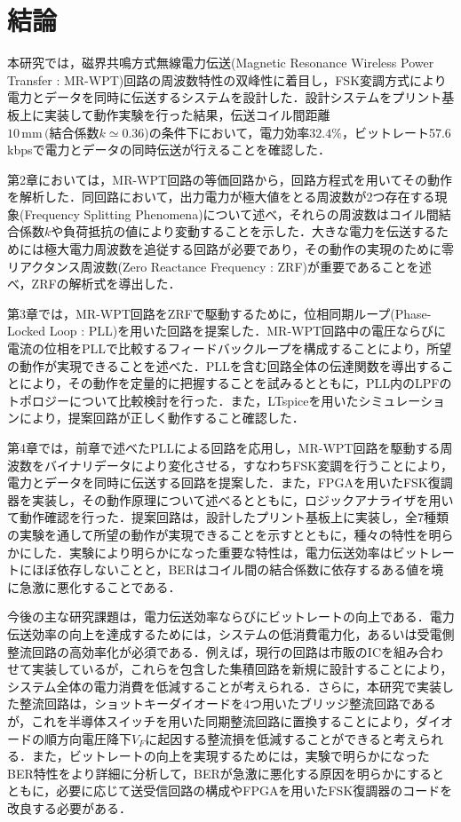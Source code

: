 \chapter{結論}
本研究では，磁界共鳴方式無線電力伝送(Magnetic Resonance Wireless Power Transfer : MR-WPT)回路の周波数特性の双峰性に着目し，FSK変調方式により電力とデータを同時に伝送するシステムを設計した．設計システムをプリント基板上に実装して動作実験を行った結果，伝送コイル間距離$10 \, \mathrm{mm} \, (\mbox{結合係数}k \simeq 0.36$)の条件下において，電力効率$32.4 \%$，ビットレート57.6 kbpsで電力とデータの同時伝送が行えることを確認した．\par 
第2章においては，MR-WPT回路の等価回路から，回路方程式を用いてその動作を解析した．同回路において，出力電力が極大値をとる周波数が2つ存在する現象(Frequency Splitting Phenomena)について述べ，それらの周波数はコイル間結合係数$k$や負荷抵抗の値により変動することを示した．大きな電力を伝送するためには極大電力周波数を追従する回路が必要であり，その動作の実現のために零リアクタンス周波数(Zero Reactance Frequency : ZRF)が重要であることを述べ，ZRFの解析式を導出した．\par 
第3章では，MR-WPT回路をZRFで駆動するために，位相同期ループ(Phase-Locked Loop : PLL)を用いた回路を提案した．MR-WPT回路中の電圧ならびに電流の位相をPLLで比較するフィードバックループを構成することにより，所望の動作が実現できることを述べた．PLLを含む回路全体の伝達関数を導出することにより，その動作を定量的に把握することを試みるとともに，PLL内のLPFのトポロジーについて比較検討を行った．また，LTspiceを用いたシミュレーションにより，提案回路が正しく動作すること確認した．\par 
第4章では，前章で述べたPLLによる回路を応用し，MR-WPT回路を駆動する周波数をバイナリデータにより変化させる，すなわちFSK変調を行うことにより，電力とデータを同時に伝送する回路を提案した．また，FPGAを用いたFSK復調器を実装し，その動作原理について述べるとともに，ロジックアナライザを用いて動作確認を行った．提案回路は，設計したプリント基板上に実装し，全7種類の実験を通して所望の動作が実現できることを示すとともに，種々の特性を明らかにした．実験により明らかになった重要な特性は，電力伝送効率はビットレートにほぼ依存しないことと，BERはコイル間の結合係数に依存するある値を境に急激に悪化することである．\par 
今後の主な研究課題は，電力伝送効率ならびにビットレートの向上である．電力伝送効率の向上を達成するためには，システムの低消費電力化，あるいは受電側整流回路の高効率化が必須である．例えば，現行の回路は市販のICを組み合わせて実装しているが，これらを包含した集積回路を新規に設計することにより，システム全体の電力消費を低減することが考えられる．さらに，本研究で実装した整流回路は，ショットキーダイオードを4つ用いたブリッジ整流回路であるが，これを半導体スイッチを用いた同期整流回路に置換することにより，ダイオードの順方向電圧降下$V_F$に起因する整流損を低減することができると考えられる．また，ビットレートの向上を実現するためには，実験で明らかになったBER特性をより詳細に分析して，BERが急激に悪化する原因を明らかにするとともに，必要に応じて送受信回路の構成やFPGAを用いたFSK復調器のコードを改良する必要がある．
